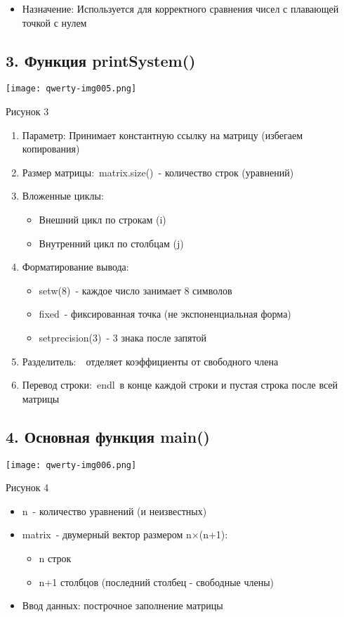 \documentclass{article}
\begin{document}
\begin{itemize}
\item Назначение: Используется для корректного сравнения чисел с плавающей точкой с нулем
\end{itemize}

\bigskip

\subsection{3. Функция printSystem()}
 \texttt{[image: qwerty-img005.png]} 

Рисунок 3

\begin{enumerate}
\item Параметр: Принимает константную ссылку на матрицу (избегаем копирования)
\item Размер матрицы: matrix.size() - количество строк (уравнений)
\item Вложенные циклы:

\begin{itemize}
\item Внешний цикл по строкам (i)
\item Внутренний цикл по столбцам (j)
\end{itemize}
\item Форматирование вывода:

\begin{itemize}
\item setw(8) - каждое число занимает 8 символов
\item fixed - фиксированная точка (не экспоненциальная форма)
\item setprecision(3) - 3 знака после запятой
\end{itemize}
\item Разделитель: {\textbar} отделяет коэффициенты от свободного члена
\item Перевод строки: endl в конце каждой строки и пустая строка после всей матрицы
\end{enumerate}
\subsection{4. Основная функция main()}
 \texttt{[image: qwerty-img006.png]} 

Рисунок 4


\bigskip

\begin{itemize}
\item n - количество уравнений (и неизвестных)
\item matrix - двумерный вектор размером n×(n+1):

\begin{itemize}
\item n строк
\item n+1 столбцов (последний столбец - свободные члены)
\end{itemize}
\item Ввод данных: построчное заполнение матрицы
\end{itemize}
\end{document}
